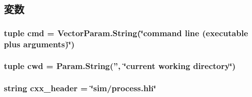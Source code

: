 \subsection{変数}
\hypertarget{classProcess_1_1LiveProcess_acb0104594e2a37355704eb5ce2484ec1}{
\subsubsection[{cmd}]{\setlength{\rightskip}{0pt plus 5cm}tuple {\bf cmd} = VectorParam.String(\char`\"{}command line ({\bf executable} plus arguments)\char`\"{})}}
\label{classProcess_1_1LiveProcess_acb0104594e2a37355704eb5ce2484ec1}
\hypertarget{classProcess_1_1LiveProcess_abbfa4358925986ea5d974c103e28e5f2}{
\subsubsection[{cwd}]{\setlength{\rightskip}{0pt plus 5cm}tuple {\bf cwd} = Param.String('', \char`\"{}current working directory\char`\"{})}}
\label{classProcess_1_1LiveProcess_abbfa4358925986ea5d974c103e28e5f2}
\hypertarget{classProcess_1_1LiveProcess_a17da7064bc5c518791f0c891eff05fda}{
\subsubsection[{cxx\_\-header}]{\setlength{\rightskip}{0pt plus 5cm}string {\bf cxx\_\-header} = \char`\"{}sim/process.hh\char`\"{}}}
\label{classProcess_1_1LiveProcess_a17da7064bc5c518791f0c891eff05fda}


